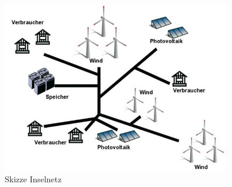 \begin{figure}[h!]
    \centering
    \includegraphics[width=10cm]{Abbildungen/StandDerTechnikAbb1.jpg}
    \caption{Skizze Inselnetz}\label{fig:Skizze_Inselnetz}
\end{figure}

